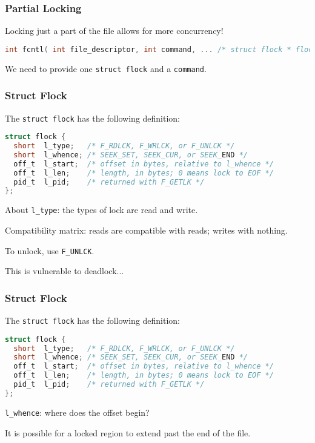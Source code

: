 \begin{frame}[fragile]
	\frametitle{Partial Locking}

	Locking just a part of the file allows for more concurrency!

	\begin{lstlisting}[language=C]
int fcntl( int file_descriptor, int command, ... /* struct flock * flockptr */ )
\end{lstlisting}

	We need to provide one \texttt{struct flock} and a \texttt{command}.


\end{frame}


\begin{frame}[fragile]
	\frametitle{Struct Flock}

	The \texttt{struct flock} has the following definition:
	\begin{lstlisting}[language=C]
struct flock {
  short  l_type;   /* F_RDLCK, F_WRLCK, or F_UNLCK */
  short  l_whence; /* SEEK_SET, SEEK_CUR, or SEEK_END */
  off_t  l_start;  /* offset in bytes, relative to l_whence */
  off_t  l_len;    /* length, in bytes; 0 means lock to EOF */
  pid_t  l_pid;    /* returned with F_GETLK */
};
\end{lstlisting}

	About \texttt{l\_type}: the types of lock are read and write.

	Compatibility matrix: reads are compatible with reads; writes with nothing.

	To unlock, use \texttt{F\_UNLCK}.

	This is vulnerable to deadlock...

\end{frame}

\begin{frame}[fragile]
	\frametitle{Struct Flock}

	The \texttt{struct flock} has the following definition:
	\begin{lstlisting}[language=C]
struct flock {
  short  l_type;   /* F_RDLCK, F_WRLCK, or F_UNLCK */
  short  l_whence; /* SEEK_SET, SEEK_CUR, or SEEK_END */
  off_t  l_start;  /* offset in bytes, relative to l_whence */
  off_t  l_len;    /* length, in bytes; 0 means lock to EOF */
  pid_t  l_pid;    /* returned with F_GETLK */
};
\end{lstlisting}

	\texttt{l\_whence}: where does the offset begin?

	It is possible for a locked region to extend past the end of the file.

\end{frame}


